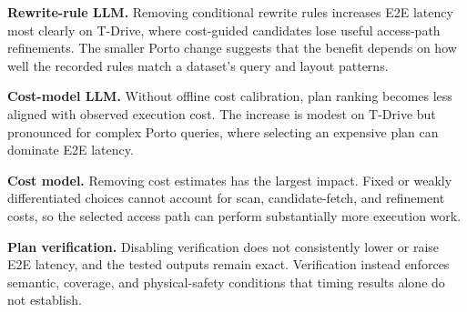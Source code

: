 \noindent\textbf{Rewrite-rule LLM.} Removing conditional rewrite rules increases E2E latency most clearly on T-Drive, where cost-guided candidates lose useful access-path refinements. The smaller Porto change suggests that the benefit depends on how well the recorded rules match a dataset's query and layout patterns.

\noindent\textbf{Cost-model LLM.} Without offline cost calibration, plan ranking becomes less aligned with observed execution cost. The increase is modest on T-Drive but pronounced for complex Porto queries, where selecting an expensive plan can dominate E2E latency.

\noindent\textbf{Cost model.} Removing cost estimates has the largest impact. Fixed or weakly differentiated choices cannot account for scan, candidate-fetch, and refinement costs, so the selected access path can perform substantially more execution work.

\noindent\textbf{Plan verification.} Disabling verification does not consistently lower or raise E2E latency, and the tested outputs remain exact. Verification instead enforces semantic, coverage, and physical-safety conditions that timing results alone do not establish.



